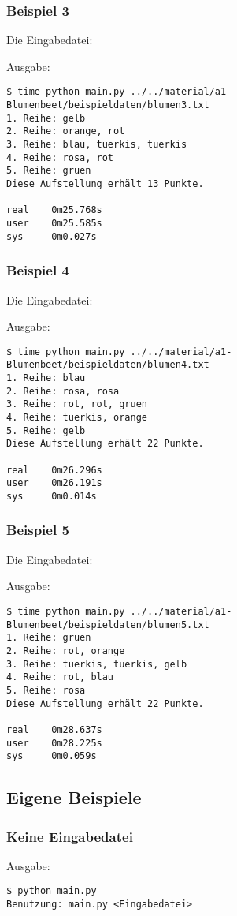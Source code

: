 \documentclass[a4paper,10pt,ngerman]{scrartcl}
\begin{document}
\subsubsection{Beispiel 3}
Die Eingabedatei:

Ausgabe:
\begin{lstlisting}
$ time python main.py ../../material/a1-Blumenbeet/beispieldaten/blumen3.txt 
1. Reihe: gelb
2. Reihe: orange, rot
3. Reihe: blau, tuerkis, tuerkis
4. Reihe: rosa, rot
5. Reihe: gruen
Diese Aufstellung erhält 13 Punkte.

real    0m25.768s
user    0m25.585s
sys     0m0.027s
\end{lstlisting}


\subsubsection{Beispiel 4}
Die Eingabedatei:

Ausgabe:
\begin{lstlisting}
$ time python main.py ../../material/a1-Blumenbeet/beispieldaten/blumen4.txt 
1. Reihe: blau
2. Reihe: rosa, rosa
3. Reihe: rot, rot, gruen
4. Reihe: tuerkis, orange
5. Reihe: gelb
Diese Aufstellung erhält 22 Punkte.

real    0m26.296s
user    0m26.191s
sys     0m0.014s
\end{lstlisting}


\subsubsection{Beispiel 5}
Die Eingabedatei:

Ausgabe:
\begin{lstlisting}
$ time python main.py ../../material/a1-Blumenbeet/beispieldaten/blumen5.txt 
1. Reihe: gruen
2. Reihe: rot, orange
3. Reihe: tuerkis, tuerkis, gelb
4. Reihe: rot, blau
5. Reihe: rosa
Diese Aufstellung erhält 22 Punkte.

real    0m28.637s
user    0m28.225s
sys     0m0.059s
\end{lstlisting}

\subsection{Eigene Beispiele}
\subsubsection{Keine Eingabedatei}
Ausgabe:
\begin{lstlisting}
$ python main.py 
Benutzung: main.py <Eingabedatei>
\end{lstlisting}
\end{document}

